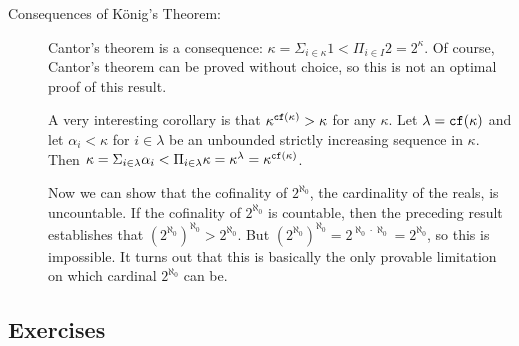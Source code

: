 \documentclass[12pt]{book}
\begin{document}
\begin{description}
\item[Consequences of K\"onig's Theorem:]  Cantor's theorem is a consequence:  $\kappa = \Sigma_{i\in \kappa} 1 < \Pi_{i \in I} 2 = 2^{\kappa}$.  Of course, Cantor's theorem can be proved without choice, so this is not an optimal proof of this result.

A very interesting corollary is that $\kappa^{{\tt cf}(\kappa)} > \kappa$ for any $\kappa$.  Let $\lambda = {\tt cf}(\kappa)$ and
let $\alpha_i<\kappa$ for $i \in \lambda$ be an unbounded strictly increasing sequence in $\kappa$.  Then $\kappa = \Sigma_{i \in \lambda}\alpha_i < \Pi_{i \in \lambda} \kappa = \kappa^{\lambda} = \kappa^{{\tt cf}(\kappa)}$.

Now we can show that the cofinality of $2^{\aleph_0}$, the cardinality of the reals, is uncountable.  If the cofinality of $2^{\aleph_0}$ is countable,
then the preceding result establishes that $(2^{\aleph_0})^{\aleph_0}>2^{\aleph_0}$.  But $(2^{\aleph_0})^{\aleph_0} = 2^{\aleph_0 \cdot \aleph_0} = 2^{\aleph_0}$, so this is impossible.  It turns out that this is basically the only provable limitation on which cardinal $2^{\aleph_0}$ can be.

\end{description}

\newpage

\subsection{Exercises}
\end{document}
